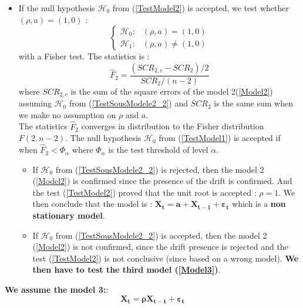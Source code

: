 \begin{itemize}
\item If the null hypothesis  $\mathcal{H}_0$  from (\ref{TestModel2}) is accepted, we test whether $(\rho, a) = (1,0)$ :
  \begin{equation}\label{TestSousModele2_2}
    \left\{
    \begin{array}{lr}
      \mathcal{H}_0 :  & (\rho, a) = (1,0) \\
      \mathcal{H}_1 : & (\rho, a) \neq (1,0)
    \end{array}
    \right.
  \end{equation}
  with a Fisher test. The statistics is :
  \begin{equation}\label{stat1}
    \displaystyle \hat{F}_2 = \frac{(SCR_{2,c} - SCR_{2})/2}{SCR_{2}/(n-2)}
  \end{equation}
  where $SCR_{2,c}$ is the sum of the square errors of the model 2(\ref{Model2}) assuming $\mathcal{H}_0$ from (\ref{TestSousModele2_2}) and $SCR_{2}$ is the same sum when we make no assumption on $\rho$ and $a$.\\
  The statistics $\hat{F}_2$ converges in distribution to the Fisher distribution $F(2, n - 2)$. The null hypothesis $\mathcal{H}_0$  from (\ref{TestModel1}) is accepted if when $ \hat{F}_2 < \Phi_{\alpha}$ where $\Phi_{\alpha}$ is the test threshold of level $\alpha$.
  \begin{itemize}
  \item If $\mathcal{H}_0$  from (\ref{TestSousModele2_2}) is rejected, then the model 2 (\ref{Model2}) is confirmed since the presence of the drift is confirmed.  And the  test (\ref{TestModel2}) proved that the unit root is accepted : $ \rho =1$. We then conclude that the model is : $\boldsymbol{X_t = a  +  X_{t-1} + \varepsilon_{t}}$ which is a {\bf non stationary model}.
  \item  If $\mathcal{H}_0$  from (\ref{TestSousModele2_2}) is accepted, then the model 2 (\ref{Model2}) is not confirmed, since the drift presence is rejected and the test (\ref{TestModel2}) is not conclusive (since based on a wrong model). {\bf We then have to test the third model (\ref{Model3})}.
  \end{itemize}

\end{itemize}


{\bf We assume the model 3:}: \\

\begin{equation}\label{Model3}
  \boldsymbol{X_t = \rho  X_{t-1} + \varepsilon_{t}}
\end{equation}

